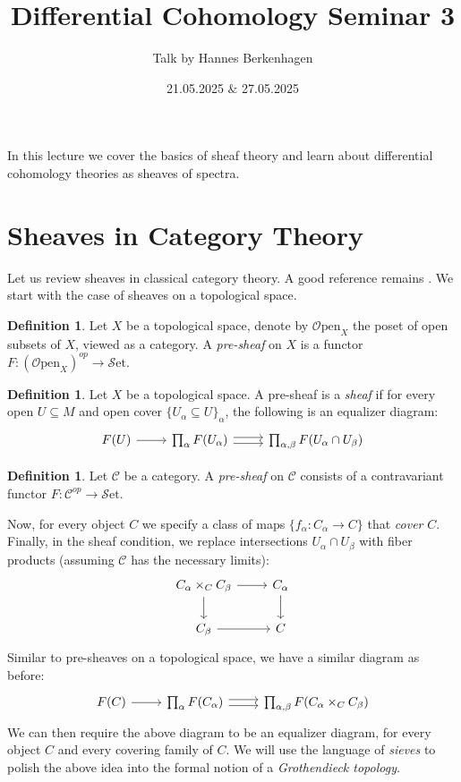 \documentclass[10pt]{amsart}
\title{Differential Cohomology Seminar 3}
\date{21.05.2025 $\&$ 27.05.2025}
\author{Talk by Hannes Berkenhagen}
\newcommand{\C}{\mathscr{C}}
\newcommand{\set}{\mathscr{S}\mathrm{et}}
\newcommand{\Open}{\mathscr{O}\mathrm{pen}}
\theoremstyle{definition}
\newtheorem{definition}[equation]{Definition}
\theoremstyle{remark}
\numberwithin{equation}{section}
\begin{document}
\maketitle

	\maketitle
	
	In this lecture we cover the basics of sheaf theory and learn about differential cohomology theories as sheaves of spectra. 
	
	\section{Sheaves in Category Theory}
	Let us review sheaves in classical category theory. A good reference remains \cite{maclanemoerdijk1994topos}. We start with  the case of sheaves on a topological space. 
	\begin{definition}
		Let $X$ be a topological space, denote by $\Open_X$ the poset of open subsets of $X$, viewed as a category. A \emph{pre-sheaf} on $X$ is a functor $F:(\Open_X)^{op}\to\set$. 
	\end{definition}
	
	\begin{definition}
		Let $X$ be a topological space. A pre-sheaf is a \emph{sheaf} if for every open $U\subseteq M$ and open cover $\{U_\alpha\subseteq U\}_{\alpha}$, the following is an equalizer diagram:
		\[
		\begin{tikzcd}
			F(U) \arrow[r] & \prod_\alpha F(U_\alpha) \arrow[r, shift left=1] \arrow[r, shift right = 1] &   \prod_{\alpha,\beta} F(U_\alpha \cap U_\beta) 
		\end{tikzcd}
		\]
	\end{definition}
	\begin{definition}
		Let $\C$ be a category. A \emph{pre-sheaf} on $\C$ consists of a contravariant functor $F\colon\C^{op}\to\set$. 
	\end{definition}
	Now, for every object $C$ we specify a class of maps $\{f_\alpha:C_\alpha\to C\}$ that \emph{cover} $C$. Finally, in the sheaf condition, we replace intersections $U_\alpha\cap U_\beta$ with fiber products (assuming $\C$ has the necessary limits):
	\[
	\begin{tikzcd} 
		C_\alpha \times_{C} C_\beta \arrow[r] \arrow[d] & C_\alpha \arrow[d] \\
		C_\beta\arrow[r] & C
	\end{tikzcd}
	\]
	Similar to pre-sheaves on a topological space, we have a similar diagram as before:\[
		\begin{tikzcd}
			F(C) \arrow[r] & \prod_\alpha F(C_\alpha) \arrow[r, shift left=1] \arrow[r, shift right = 1] &   \prod_{\alpha,\beta} F(C_\alpha \times_C C_\beta) 
		\end{tikzcd}
		\]
	We can then require the above diagram to be an equalizer diagram, for every object $C$ and every covering family of $C$. We will use the language of \emph{sieves} to polish the above idea into the formal notion of a \emph{Grothendieck topology}. 
	
\end{document}
